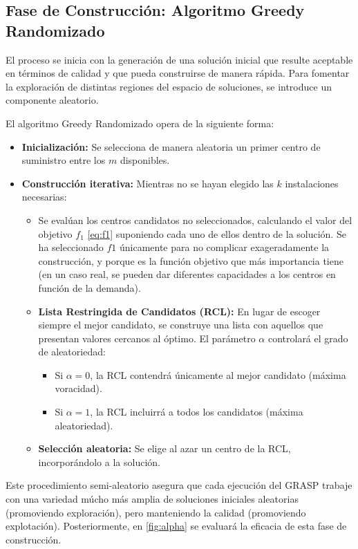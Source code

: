 \documentclass[12pt,a4paper]{book}
\begin{document}
\subsection{Fase de Construcción: Algoritmo Greedy Randomizado}
El proceso se inicia con la generación de una solución inicial que resulte aceptable en términos de calidad y que pueda construirse de manera rápida. Para fomentar la exploración de distintas regiones del espacio de soluciones, se introduce un componente aleatorio.  

El algoritmo Greedy Randomizado opera de la siguiente forma:  

\begin{itemize}
    \item \textbf{Inicialización:} Se selecciona de manera aleatoria un primer centro de suministro entre los $m$ disponibles.
    \item \textbf{Construcción iterativa:} Mientras no se hayan elegido las $k$ instalaciones necesarias:
    \begin{itemize}
        \item Se evalúan los centros candidatos no seleccionados, calculando el valor del objetivo $f_1$ \ref{eq:f1} suponiendo cada uno de ellos dentro de la solución. Se ha seleccionado $f1$ únicamente para no complicar
        exageradamente la construcción, y porque es la función objetivo que más importancia tiene (en un caso real, se pueden dar diferentes capacidades a los centros en función de la demanda).
        \item \textbf{Lista Restringida de Candidatos (RCL):} En lugar de escoger siempre el mejor candidato, se construye una lista con aquellos que presentan valores cercanos al óptimo. El parámetro $\alpha$ controlará el grado de aleatoriedad:
        \begin{itemize}
            \item Si $\alpha = 0$, la RCL contendrá únicamente al mejor candidato (máxima voracidad).
            \item Si $\alpha = 1$, la RCL incluirrá a todos los candidatos (máxima aleatoriedad).
        \end{itemize}
        \item \textbf{Selección aleatoria:} Se elige al azar un centro de la RCL, incorporándolo a la solución.
    \end{itemize}
\end{itemize}

Este procedimiento semi-aleatorio asegura que cada ejecución del GRASP trabaje con una variedad múcho más amplia de soluciones iniciales aleatorias (promoviendo exploración), pero manteniendo la calidad (promoviendo explotación). Posteriormente, en \ref{fig:alpha} se evaluará la eficacia de esta fase de construcción.
\end{document}

